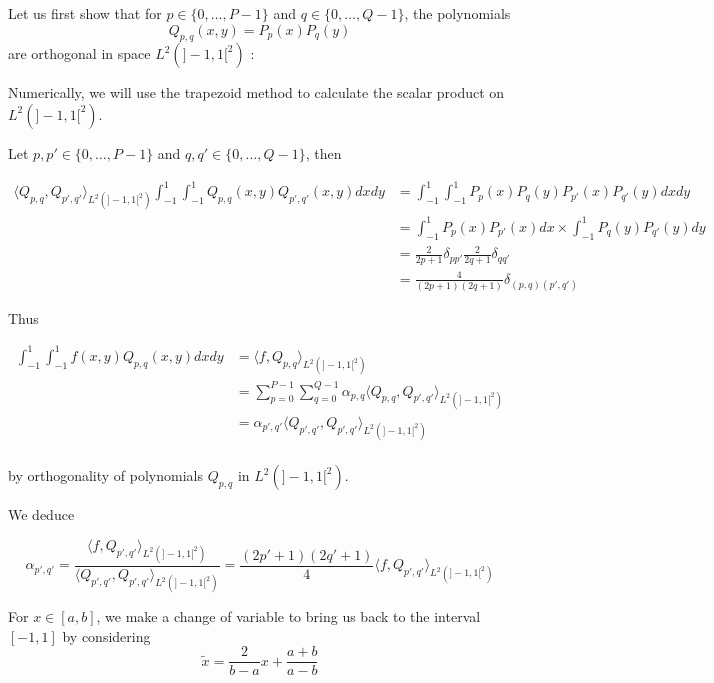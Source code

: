 Let us first show that for $p\in\{0,\dots,P-1\}$ and $q\in\{0,\dots,Q-1\}$, the polynomials
\begin{equation*}
	Q_{p,q}(x,y)=P_p(x)P_q(y)
\end{equation*}
are orthogonal in space $L^2(]-1,1[^2)$ :

\begin{Rem}
	Numerically, we will use the trapezoid method to calculate the scalar product on $L^2(]-1,1[^2)$.
\end{Rem}

Let $p,p'\in\{0,\dots,P-1\}$ and $q,q'\in\{0,\dots,Q-1\}$, then

\begin{align*}
	\langle Q_{p,q},Q_{p',q'}\rangle_{L^2(]-1,1[^2)}\int_{-1}^1 \int_{-1}^1 Q_{p,q}(x,y)Q_{p',q'}(x,y)dxdy&=\int_{-1}^1 \int_{-1}^1 P_p(x)P_q(y)P_{p'}(x)P_{q'}(y)dxdy \\
	&=\int_{-1}^1 P_p(x)P_{p'}(x)dx\times \int_{-1}^1 P_q(y)P_{q'}(y)dy \\
	&=\frac{2}{2p+1}\delta_{pp'}\frac{2}{2q+1}\delta_{qq'} \\
	&=\frac{4}{(2p+1)(2q+1)}\delta_{(p,q)(p',q')}
\end{align*}

Thus

\begin{align*}
	\int_{-1}^1 \int_{-1}^1 f(x,y)Q_{p,q}(x,y)dxdy &= \langle f,Q_{p,q}\rangle_{L^2(]-1,1[^2)} \\
	&=\sum_{p=0}^{P-1}\sum_{q=0}^{Q-1}\alpha_{p,q} \langle Q_{p,q},Q_{p',q'}\rangle_{L^2(]-1,1[^2)} \\
	&=\alpha_{p',q'} \langle Q_{p',q'},Q_{p',q'}\rangle_{L^2(]-1,1[^2)} \\
\end{align*}

by orthogonality of polynomials $Q_{p,q}$ in  $L^2(]-1,1[^2)$. 

We deduce

$$\alpha_{p',q'} = \frac{\langle f,Q_{p',q'}\rangle_{L^2(]-1,1[^2)}}{\langle Q_{p',q'},Q_{p',q'}\rangle_{L^2(]-1,1[^2)}}=\frac{(2p'+1)(2q'+1)}{4}\langle f,Q_{p',q'}\rangle_{L^2(]-1,1[^2)}$$

\begin{Rem}
	For $x\in[a,b]$, we make a change of variable to bring us back to the interval $[-1,1]$ by considering
	\begin{equation*}
		\tilde{x}=\frac{2}{b-a}x+\frac{a+b}{a-b}
	\end{equation*}
\end{Rem}

